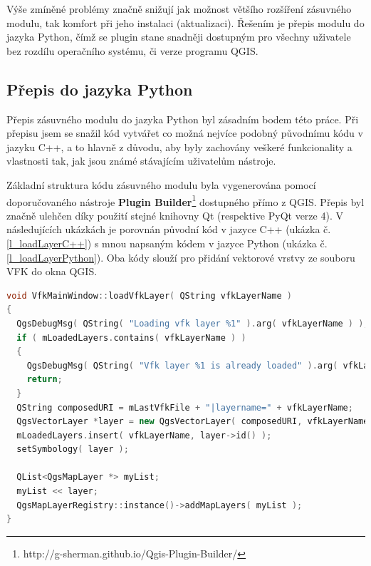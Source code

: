 \documentclass[a4paper,12pt,oneside]{book}
\begin{document}
Výše zmíněné problémy značně snižují jak možnost většího rozšíření zásuvného modulu, tak komfort při jeho instalaci (aktualizaci). Řešením je přepis modulu do jazyka Python, čímž se plugin stane snadněji dostupným pro všechny uživatele bez rozdílu operačního systému, či verze programu QGIS.

\subsection{Přepis do jazyka Python}
Přepis zásuvného modulu do jazyka Python byl zásadním bodem této práce. Při přepisu jsem se snažil kód vytvářet co možná nejvíce podobný původnímu kódu v jazyku C++, a to hlavně z důvodu, aby byly zachovány veškeré funkcionality a vlastnosti tak, jak jsou známé stávajícím uživatelům nástroje.

Základní struktura kódu zásuvného modulu byla vygenerována pomocí doporučovaného nástroje \textbf{Plugin Builder}\footnote{http://g-sherman.github.io/Qgis-Plugin-Builder/} dostupného přímo z QGIS. Přepis byl značně ulehčen díky použití stejné knihovny Qt (respektive PyQt verze 4). V následujících ukázkách je porovnán původní kód v jazyce C++ (ukázka č. \ref{l_loadLayerC++}) s mnou napsaným kódem v jazyce Python (ukázka č. \ref{l_loadLayerPython}). Oba kódy slouží pro přidání vektorové vrstvy ze souboru VFK do okna QGIS.

\begin{lstlisting}[language=C++, 
		    caption=Kód pro načtení vektorové vrstvy v C++, 
		    keywordstyle=\color{blue}\ttfamily,
		    stringstyle=\color{red}\ttfamily,
		    commentstyle=\color{green}\ttfamily, morekeywords={QgsDebugMsg,QString,QgsVectorLayer,QList,QgsMapLayerRegistry},
		    label=l_loadLayerC++]
 void VfkMainWindow::loadVfkLayer( QString vfkLayerName )
{
  QgsDebugMsg( QString( "Loading vfk layer %1" ).arg( vfkLayerName ) );
  if ( mLoadedLayers.contains( vfkLayerName ) )
  {
    QgsDebugMsg( QString( "Vfk layer %1 is already loaded" ).arg( vfkLayerName ) );
    return;
  }
  QString composedURI = mLastVfkFile + "|layername=" + vfkLayerName;
  QgsVectorLayer *layer = new QgsVectorLayer( composedURI, vfkLayerName, "ogr" );
  mLoadedLayers.insert( vfkLayerName, layer->id() );
  setSymbology( layer );

  QList<QgsMapLayer *> myList;
  myList << layer;
  QgsMapLayerRegistry::instance()->addMapLayers( myList );
}
\end{lstlisting}
\end{document}
